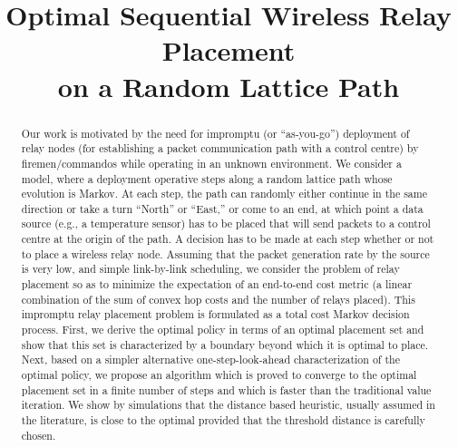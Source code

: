\documentclass[conference]{IEEEtran}
\begin{document}
\title{Optimal Sequential Wireless Relay Placement \\
on a Random Lattice Path}

\author{
}
\maketitle

\begin{abstract}
  Our work is motivated by the need for impromptu (or ``as-you-go'')
  deployment of relay nodes (for establishing a packet communication path
  with a control centre) by firemen/commandos while operating in an
  unknown environment. We consider a model, where a deployment
  operative steps along a random lattice path whose evolution is
  Markov. At each step, the path can randomly either continue in the
  same direction or take a turn ``North'' or ``East,'' or come to an
  end, at which point a data source (e.g., a temperature sensor) has
  to be placed that will send packets to a control centre at the
  origin of the path. A decision has to be made at each step whether
  or not to place a wireless relay node. Assuming that the packet
  generation rate by the source is very low, and simple link-by-link
  scheduling, we consider the problem of relay placement so as to
  minimize the expectation of an end-to-end cost metric (a linear
  combination of the sum of convex hop costs and the number of relays
  placed). This impromptu relay placement problem is formulated as a
  total cost Markov decision process.  First, we derive the optimal
  policy in terms of an optimal placement set and show that this set
  is characterized by a boundary beyond which it is optimal to
  place. Next, based on a simpler alternative one-step-look-ahead
  characterization of the optimal policy, we propose an algorithm
  which is proved to converge to the optimal placement set in a finite
  number of steps and which is faster than the traditional value
  iteration. We show by simulations that the distance based heuristic,
  usually assumed in the literature, is close to the optimal provided
  that the threshold distance is carefully chosen.
\end{abstract}
\end{document}
